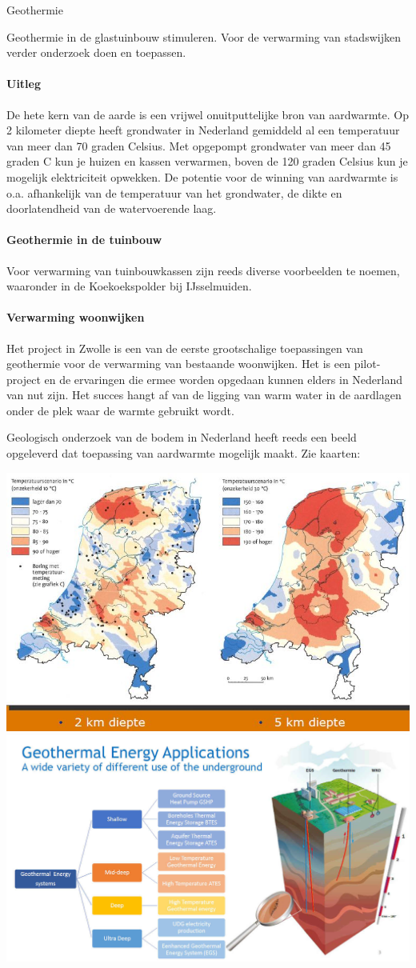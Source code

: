 \begin{voorstel}{Geothermie}
\begin{overwegingen}
Geothermie in de glastuinbouw stimuleren.
Voor de verwarming van stadswijken verder onderzoek doen en toepassen.

\paragraph{Uitleg}
De hete kern van de aarde is een vrijwel onuitputtelijke bron van aardwarmte. Op 2 kilometer diepte heeft grondwater in Nederland gemiddeld al een temperatuur van meer dan 70 graden Celsius. Met opgepompt grondwater van meer dan 45 graden C kun je huizen en kassen verwarmen, boven de 120 graden Celsius kun je mogelijk elektriciteit opwekken. De potentie voor de winning van aardwarmte is o.a. afhankelijk van de temperatuur van het grondwater, de dikte en doorlatendheid van de watervoerende laag.

\paragraph{Geothermie in de tuinbouw}
Voor verwarming van tuinbouwkassen zijn reeds diverse voorbeelden te noemen, waaronder in de Koekoekspolder bij IJsselmuiden.

\paragraph{Verwarming woonwijken}
Het project in Zwolle is een van de eerste grootschalige toepassingen van geothermie voor de verwarming van bestaande woonwijken. Het is een pilot-project en de ervaringen die ermee worden opgedaan kunnen elders in Nederland van nut zijn. Het succes hangt af van de ligging van warm water in de aardlagen onder de plek waar de warmte gebruikt wordt.

Geologisch onderzoek van de bodem in Nederland heeft reeds een beeld opgeleverd dat toepassing van aardwarmte mogelijk maakt. Zie kaarten:

\includegraphics[width=.5\textwidth]{img/energie/geothermie-temperatuurscenarios}
\includegraphics[width=.5\textwidth]{img/energie/geothermie-applications}


\end{overwegingen}
\end{voorstel}
